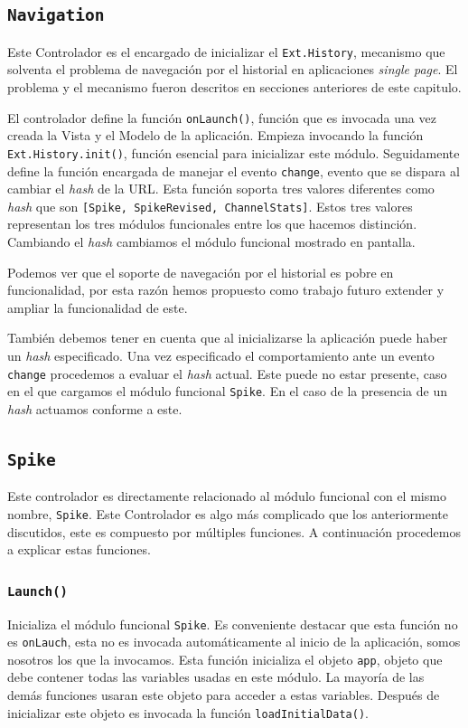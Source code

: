 	\subsection{\texttt{Navigation}}
		Este Controlador es el encargado de inicializar el \texttt{Ext.History}, mecanismo que solventa el problema de navegación por el
		historial en aplicaciones \emph{single page}. El problema y el mecanismo fueron descritos en secciones anteriores de este capitulo.
		\par
		El controlador  define la función \texttt{onLaunch()}, función que es invocada una vez creada la Vista y el Modelo de la aplicación.
		Empieza invocando la función \texttt{Ext.History.init()}, función esencial para inicializar este módulo. Seguidamente define la
		función encargada de manejar el evento \texttt{change}, evento que se dispara al cambiar el \emph{hash} de la URL. Esta función
		soporta tres valores diferentes como \emph{hash} que son \texttt{[Spike, SpikeRevised, ChannelStats]}. Estos tres valores
		representan los tres módulos funcionales entre los que hacemos distinción.  Cambiando el \emph{hash} cambiamos el módulo funcional
		mostrado en pantalla.
		\par
		Podemos ver que el soporte de navegación por el historial es pobre en funcionalidad, por esta razón hemos propuesto como trabajo
		futuro extender y ampliar la funcionalidad de este.
		\par
		También debemos tener en cuenta que al inicializarse la aplicación puede haber un \emph{hash} especificado. Una vez especificado el
		comportamiento ante un evento \texttt{change} procedemos a evaluar el \emph{hash} actual. Este puede no estar presente, caso en el que
		cargamos el módulo funcional \texttt{Spike}. En el caso de la presencia de un \emph{hash} actuamos conforme a este.
	\subsection{\texttt{Spike}}
		Este controlador es directamente relacionado al módulo funcional con el mismo nombre, \texttt{Spike}. Este Controlador es algo más
		complicado que los anteriormente discutidos, este es compuesto por múltiples funciones. A continuación procedemos a explicar estas
		funciones.
		\subsubsection{\texttt{Launch()}}
			Inicializa el módulo funcional \texttt{Spike}. Es conveniente destacar que esta función no es \texttt{onLauch}, esta no es
			invocada automáticamente al inicio de la aplicación, somos nosotros los que la invocamos. Esta función inicializa el objeto
			\texttt{app}, objeto que debe contener todas las variables usadas en este módulo. La mayoría de las demás funciones usaran
			este objeto para acceder a estas variables. Después de inicializar este objeto es invocada la función
			\texttt{loadInitialData()}.
